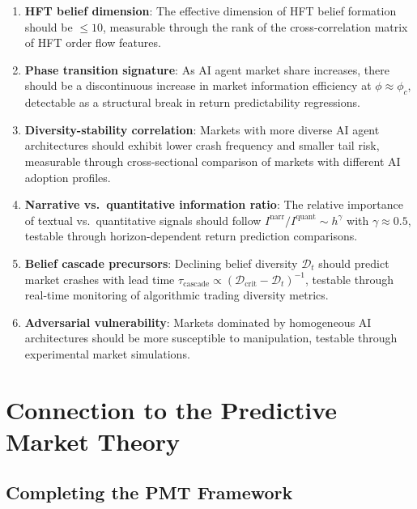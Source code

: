 \documentclass[12pt,a4paper]{article}
\theoremstyle{definition}
\begin{document}
\begin{enumerate}
  \item \textbf{HFT belief dimension}: The effective dimension of HFT belief formation should be $\leq 10$, measurable through the rank of the cross-correlation matrix of HFT order flow features.

  \item \textbf{Phase transition signature}: As AI agent market share increases, there should be a discontinuous increase in market information efficiency at $\phi \approx \phi_c$, detectable as a structural break in return predictability regressions.

  \item \textbf{Diversity-stability correlation}: Markets with more diverse AI agent architectures should exhibit lower crash frequency and smaller tail risk, measurable through cross-sectional comparison of markets with different AI adoption profiles.

  \item \textbf{Narrative vs.\ quantitative information ratio}: The relative importance of textual vs.\ quantitative signals should follow $I^{\mathrm{narr}}/I^{\mathrm{quant}} \sim h^\gamma$ with $\gamma \approx 0.5$, testable through horizon-dependent return prediction comparisons.

  \item \textbf{Belief cascade precursors}: Declining belief diversity $\mathcal{D}_t$ should predict market crashes with lead time $\tau_{\mathrm{cascade}} \propto (\mathcal{D}_{\mathrm{crit}} - \mathcal{D}_t)^{-1}$, testable through real-time monitoring of algorithmic trading diversity metrics.

  \item \textbf{Adversarial vulnerability}: Markets dominated by homogeneous AI architectures should be more susceptible to manipulation, testable through experimental market simulations.
\end{enumerate}

\section{Connection to the Predictive Market Theory}\label{sec:pmt-connection}

\subsection{Completing the PMT Framework}
\end{document}
